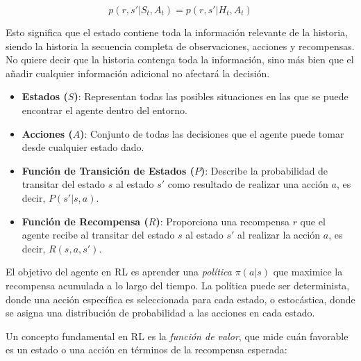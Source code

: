 \documentclass[a4paper,12pt]{report}
\begin{document}
\[
p(r, s' | S_t, A_t) = p(r, s' | H_t, A_t)
\]

Esto significa que el estado contiene toda la información relevante de la historia, siendo la historia 
la secuencia completa de observaciones, acciones y recompensas. No quiere decir que la historia contenga
toda la información, sino más bien que el añadir cualquier información adicional no afectará la decisión.

\begin{itemize}
    \item \textbf{Estados (\(S\))}: Representan todas las posibles situaciones en las que se puede 
    encontrar el agente dentro del entorno.
    \item \textbf{Acciones (\(A\))}: Conjunto de todas las decisiones que el agente puede tomar 
    desde cualquier estado dado.
    \item \textbf{Función de Transición de Estados (\(P\))}: Describe la probabilidad de transitar 
    del estado \(s\) al estado \(s'\) como resultado de realizar una acción \(a\), es decir, \(P(s'|s, a)\).
    \item \textbf{Función de Recompensa (\(R\))}: Proporciona una recompensa \(r\) que el agente 
    recibe al transitar del estado \(s\) al estado \(s'\) al realizar la acción \(a\), es decir, \(R(s, a, s')\).
\end{itemize}

El objetivo del agente en RL es aprender una \textit{política} \(\pi(a|s)\) que maximice la recompensa 
acumulada a lo largo del tiempo. La política puede ser determinista, donde una acción específica es 
seleccionada para cada estado, o estocástica, donde se asigna una distribución de probabilidad a las
acciones en cada estado.

Un concepto fundamental en RL es la \textit{función de valor}, que mide cuán favorable es un estado 
o una acción en términos de la recompensa esperada:
\end{document}
